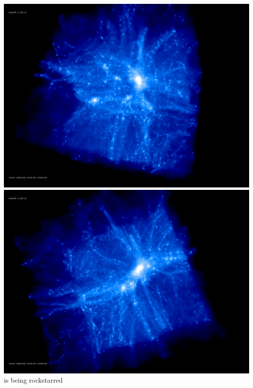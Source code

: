 \includegraphics[scale=0.1]{stages_21/rotate_00074.jpg} 
\includegraphics[scale=0.1]{stages_21/rotate_00131.jpg}  \\

is being rockstarred \\

